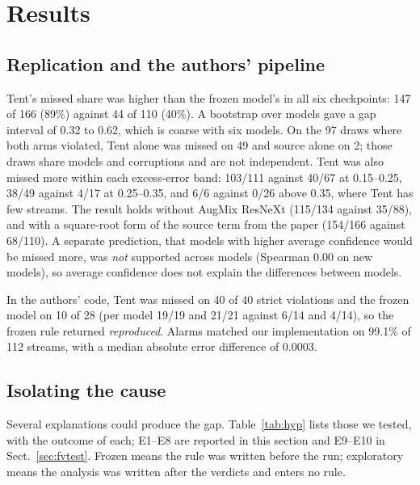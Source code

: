 \documentclass[runningheads]{llncs}
\begin{document}
\section{Results}
\subsection{Replication and the authors' pipeline}
\label{sec:gap}
Tent's missed share was higher than the frozen model's in all six checkpoints: 147 of 166 (89\%) against 44 of 110 (40\%). A bootstrap over models gave a gap interval of 0.32 to 0.62, which is coarse with six models. On the 97 draws where both arms violated, Tent alone was missed on 49 and source alone on 2; those draws share models and corruptions and are not independent. Tent was also missed more within each excess-error band: 103/111 against 40/67 at 0.15--0.25, 38/49 against 4/17 at 0.25--0.35, and 6/6 against 0/26 above 0.35, where Tent has few streams. The result holds without AugMix ResNeXt (115/134 against 35/88), and with a square-root form of the source term from the paper (154/166 against 68/110). A separate prediction, that models with higher average confidence would be missed more, was \emph{not} supported across models (Spearman 0.00 on new models), so average confidence does not explain the differences between models.

In the authors' code, Tent was missed on 40 of 40 strict violations and the frozen model on 10 of 28 (per model 19/19 and 21/21 against 6/14 and 4/14), so the frozen rule returned \emph{reproduced}. Alarms matched our implementation on 99.1\% of 112 streams, with a median absolute error difference of 0.0003.

\subsection{Isolating the cause}
\label{sec:cause}
Several explanations could produce the gap. Table~\ref{tab:hyp} lists those we tested, with the outcome of each; E1--E8 are reported in this section and E9--E10 in Sect.~\ref{sec:fvtest}. Frozen means the rule was written before the run; exploratory means the analysis was written after the verdicts and enters no rule.
\end{document}
